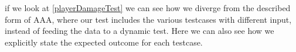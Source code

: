 if we look at \autoref{playerDamageTest} we can see how we diverge from the described form of AAA, where our test includes the various testcases with different input, instead of feeding the data to a dynamic test. Here we can also see how we explicitly state the expected outcome for each testcase. 



